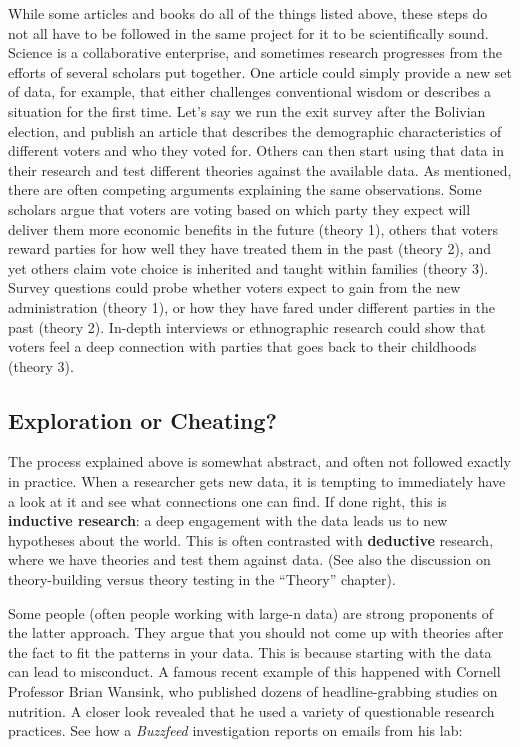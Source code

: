 \documentclass{book}
\begin{document}
While some articles and books do all of the things listed above, these steps
do not all have to be followed in the same project for it to be scientifically
sound. Science is a collaborative enterprise, and sometimes research
progresses from the efforts of several scholars put together. One article
could simply provide a new set of data, for example, that either challenges
conventional wisdom or describes a situation for the first time. Let's say we
run the exit survey after the Bolivian election, and publish an article that
describes the demographic characteristics of different voters and who they
voted for. Others can then start using that data in their research and test
different theories against the available data. As mentioned, there are often
competing arguments explaining the same observations. Some scholars argue that
voters are voting based on which party they expect will deliver them more
economic benefits in the future (theory 1), others that voters reward parties
for how well they have treated them in the past (theory 2), and yet others
claim vote choice is inherited and taught within families (theory 3). Survey
questions could probe whether voters expect to gain from the new
administration (theory 1), or how they have fared under different parties in
the past (theory 2). In-depth interviews or ethnographic research could show
that voters feel a deep connection with parties that goes back to their
childhoods (theory 3).

\hypertarget{exploration-or-cheating}{%
\subsection{Exploration or Cheating?}\label{exploration-or-cheating}}

The process explained above is somewhat abstract, and often not followed
exactly in practice. When a researcher gets new data, it is tempting to
immediately have a look at it and see what connections one can find. If done
right, this is \textbf{inductive research}: a deep engagement with the data
leads us to new hypotheses about the world. This is often contrasted with
\textbf{deductive} research, where we have theories and test them against
data. (See also the discussion on theory-building versus theory testing in the
``Theory'' chapter).

Some people (often people working with large-n data) are strong proponents of
the latter approach. They argue that you should not come up with theories
after the fact to fit the patterns in your data. This is because starting with
the data can lead to misconduct. A famous recent example of this happened with
Cornell Professor Brian Wansink, who published dozens of headline-grabbing
studies on nutrition. A closer look revealed that he used a variety of
questionable research practices. See how a \emph{Buzzfeed} investigation
reports on emails from his lab:
\end{document}
